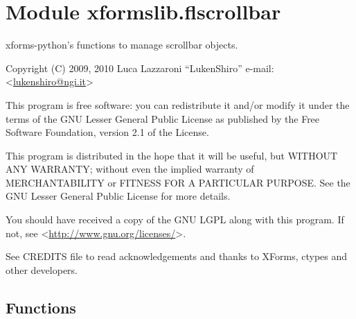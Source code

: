 %
%
%


\section{Module xformslib.flscrollbar}

    \label{xformslib:flscrollbar}

xforms-python's functions to manage scrollbar objects.

Copyright (C) 2009, 2010  Luca Lazzaroni ``LukenShiro''
e-mail: <\href{mailto:lukenshiro@ngi.it}{lukenshiro@ngi.it}>

This program is free software: you can redistribute it and/or modify
it under the terms of the GNU Lesser General Public License as
published by the Free Software Foundation, version 2.1 of the License.

This program is distributed in the hope that it will be useful,
but WITHOUT ANY WARRANTY; without even the implied warranty of
MERCHANTABILITY or FITNESS FOR A PARTICULAR PURPOSE. See the
GNU Lesser General Public License for more details.

You should have received a copy of the GNU LGPL along with this
program. If not, see <\href{http://www.gnu.org/licenses/}{http://www.gnu.org/licenses/}>.

See CREDITS file to read acknowledgements and thanks to XForms,
ctypes and other developers.


  \subsection{Functions}

    \label{xformslib:flscrollbar:fl_add_scrollbar}

